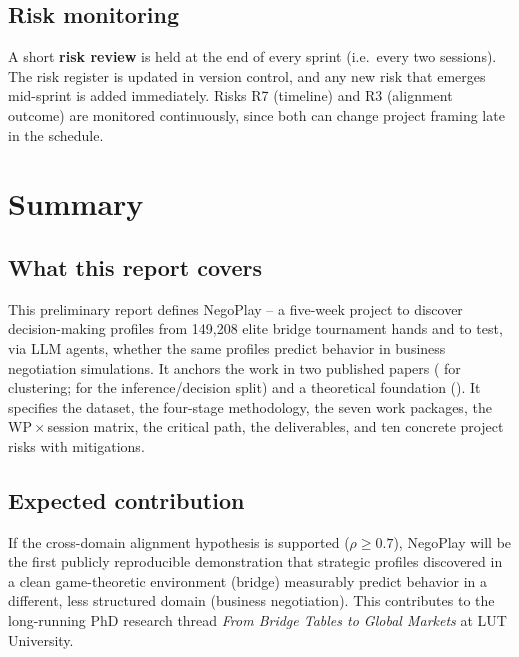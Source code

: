 \documentclass[11pt, a4paper, oneside, openany]{report}
\begin{document}
\section{Risk monitoring}

A short \textbf{risk review} is held at the end of every sprint (i.e.\ every two sessions). The risk register is updated in version control, and any new risk that emerges mid-sprint is added immediately. Risks R7 (timeline) and R3 (alignment outcome) are monitored continuously, since both can change project framing late in the schedule.

\chapter{Summary}
\label{ch:summary}

\section{What this report covers}

This preliminary report defines NegoPlay -- a five-week project to discover decision-making profiles from 149{,}208 elite bridge tournament hands and to test, via LLM agents, whether the same profiles predict behavior in business negotiation simulations. It anchors the work in two published papers (\citealp{talwadker2022cognitionnet} for clustering; \citealp{rong2019competitive} for the inference/decision split) and a theoretical foundation (\citealp{lockett2007evolving}). It specifies the dataset, the four-stage methodology, the seven work packages, the WP\,$\times$\,session matrix, the critical path, the deliverables, and ten concrete project risks with mitigations.

\section{Expected contribution}

If the cross-domain alignment hypothesis is supported ($\rho \geq 0.7$), NegoPlay will be the first publicly reproducible demonstration that strategic profiles discovered in a clean game-theoretic environment (bridge) measurably predict behavior in a different, less structured domain (business negotiation). This contributes to the long-running PhD research thread \emph{From Bridge Tables to Global Markets} at LUT University.
\end{document}
